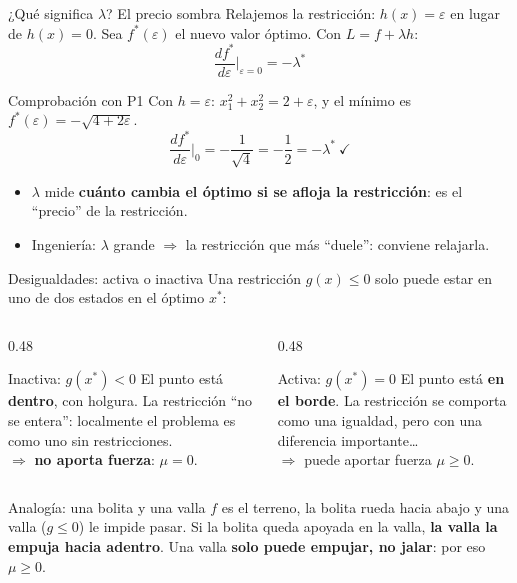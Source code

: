 \documentclass[aspectratio=169]{beamer}
\newcommand{\xs}{x^\ast}
\begin{document}
\begin{frame}{¿Qué significa $\lambda$? El precio sombra}
  Relajemos la restricción: $h(x)=\varepsilon$ en lugar de $h(x)=0$. Sea $f^\ast(\varepsilon)$ el nuevo valor óptimo. Con $L=f+\lambda h$:
  \[ \boxed{\ \frac{d f^\ast}{d\varepsilon}\Big|_{\varepsilon=0}=-\lambda^\ast\ } \]
  \begin{exampleblock}{Comprobación con P1}
    Con $h=\varepsilon$: $x_1^2+x_2^2=2+\varepsilon$, y el mínimo es $f^\ast(\varepsilon)=-\sqrt{4+2\varepsilon}$.
    \[ \frac{df^\ast}{d\varepsilon}\Big|_0=-\frac{1}{\sqrt{4}}=-\frac12=-\lambda^\ast\ \checkmark \]
  \end{exampleblock}
  \begin{itemize}
    \item $\lambda$ mide \textbf{cuánto cambia el óptimo si se afloja la restricción}: es el ``precio'' de la restricción.
    \item Ingeniería: $\lambda$ grande $\Rightarrow$ la restricción que más ``duele'': conviene relajarla.
  \end{itemize}
\end{frame}

\begin{frame}{Desigualdades: activa o inactiva}
  Una restricción $g(x)\le0$ solo puede estar en uno de dos estados en el óptimo $\xs$:
  \begin{columns}[T]
    \begin{column}{0.48\textwidth}
      \begin{block}{Inactiva: $g(\xs)<0$}
        El punto está \textbf{dentro}, con holgura. La restricción ``no se entera'': localmente el problema es como uno sin restricciones.\\[3pt]
        $\Rightarrow$ \textbf{no aporta fuerza}: $\mu=0$.
      \end{block}
    \end{column}
    \begin{column}{0.48\textwidth}
      \begin{block}{Activa: $g(\xs)=0$}
        El punto está \textbf{en el borde}. La restricción se comporta como una igualdad, pero con una diferencia importante\dots\\[3pt]
        $\Rightarrow$ puede aportar fuerza $\mu\ge0$.
      \end{block}
    \end{column}
  \end{columns}
  \vspace{0.3cm}
  \begin{alertblock}{Analogía: una bolita y una valla}
    $f$ es el terreno, la bolita rueda hacia abajo y una valla ($g\le0$) le impide pasar. Si la bolita queda apoyada en la valla, \textbf{la valla la empuja hacia adentro}. Una valla \textbf{solo puede empujar, no jalar}: por eso $\mu\ge0$.
  \end{alertblock}
\end{frame}
\end{document}
